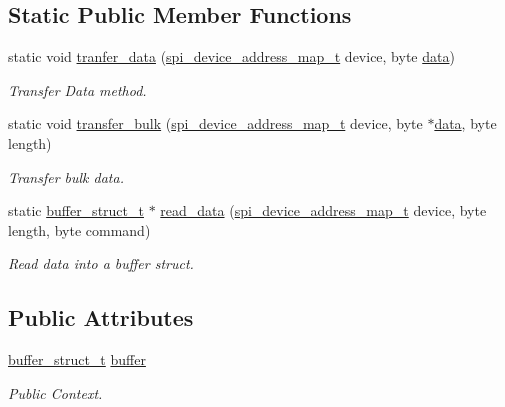 \subsection*{\-Static \-Public \-Member \-Functions}
\begin{DoxyCompactItemize}
\item 
static void \hyperlink{class_g_h_i_d___s_p_i_a9cc5cdee38071b54566c57783443b17b}{tranfer\-\_\-data} (\hyperlink{_g_h_i_d___s_p_i_8h_a9d51766baec84fc8f27a377fb7a1ace7}{spi\-\_\-device\-\_\-address\-\_\-map\-\_\-t} device, byte \hyperlink{masstorage_8h_afb87d045bbf32b236fc425efe02bdc7b}{data})
\begin{DoxyCompactList}\small\item\em \-Transfer \-Data method. \end{DoxyCompactList}\item 
static void \hyperlink{class_g_h_i_d___s_p_i_adb5f0f373d1c6f3da3bb5323c9ad3ec1}{transfer\-\_\-bulk} (\hyperlink{_g_h_i_d___s_p_i_8h_a9d51766baec84fc8f27a377fb7a1ace7}{spi\-\_\-device\-\_\-address\-\_\-map\-\_\-t} device, byte $\ast$\hyperlink{masstorage_8h_afb87d045bbf32b236fc425efe02bdc7b}{data}, byte length)
\begin{DoxyCompactList}\small\item\em \-Transfer bulk data. \end{DoxyCompactList}\item 
static \hyperlink{structbuffer__struct__t}{buffer\-\_\-struct\-\_\-t} $\ast$ \hyperlink{class_g_h_i_d___s_p_i_a1112a6f569a6e570f166a2976f69291e}{read\-\_\-data} (\hyperlink{_g_h_i_d___s_p_i_8h_a9d51766baec84fc8f27a377fb7a1ace7}{spi\-\_\-device\-\_\-address\-\_\-map\-\_\-t} device, byte length, byte command)
\begin{DoxyCompactList}\small\item\em \-Read data into a buffer struct. \end{DoxyCompactList}\end{DoxyCompactItemize}
\subsection*{\-Public \-Attributes}
\begin{DoxyCompactItemize}
\item 
\hyperlink{structbuffer__struct__t}{buffer\-\_\-struct\-\_\-t} \hyperlink{class_g_h_i_d___s_p_i_a64390f195aa7bb3e4f4077fb80d89c78}{buffer}
\begin{DoxyCompactList}\small\item\em \-Public \-Context. \end{DoxyCompactList}\end{DoxyCompactItemize}


